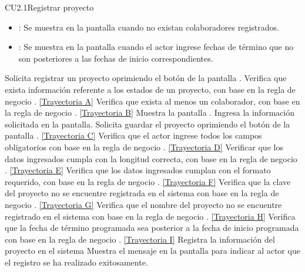 \begin{UseCase}{CU2.1}{Registrar proyecto}
{\begin{itemize}
		\item {}: Se muestra en la pantalla  cuando no existan colaboradores registrados.
		\item {}: Se muestra en la pantalla  cuando el actor ingrese fechas de término que no son posteriores a las fechas
		de inicio correspondientes.
		\end{itemize}
		}
	\end{UseCase}
	\begin{UCtrayectoria}
		\UCpaso[\UCactor] Solicita registrar un proyecto oprimiendo el botón  de la pantalla .
		\UCpaso[\UCsist] Verifica que exista información referente a los estados de un proyecto, con base en la regla de negocio . \hyperlink{CU2-1:TAA}{[Trayectoria A]}
		\UCpaso[\UCsist] Verifica que exista al menos un colaborador, con base en la regla de negocio . \hyperlink{CU2-1:TAB}{[Trayectoria B]}
		\UCpaso[\UCsist] Muestra la pantalla .
		\UCpaso[\UCactor] Ingresa la información solicitada en la pantalla. \label{CU2.1-P5}
		\UCpaso[\UCactor] Solicita guardar el proyecto oprimiendo el botón  de la pantalla . \hyperlink{CU2-1:TAC}{[Trayectoria C]}
		\UCpaso[\UCsist] Verifica que el actor ingrese todos los campos obligatorios con base en la regla de negocio . \hyperlink{CU2-1:TAD}{[Trayectoria D]}
		\UCpaso[\UCsist] Verificar que los datos ingresados cumpla con la longitud correcta, con base en la regla de negocio . \hyperlink{CU2-1:TAE}{[Trayectoria E]}
		\UCpaso[\UCsist] Verifica que los datos ingresados cumplan con el formato requerido, con base en la regla de negocio . \hyperlink{CU2-1:TAF}{[Trayectoria F]}
		\UCpaso[\UCsist] Verifica que la clave del proyecto no se encuentre registrada en el sistema con base en la regla de negocio . \hyperlink{CU2-1:TAG}{[Trayectoria G]}
		\UCpaso[\UCsist] Verifica que el nombre del proyecto no se encuentre registrado en el sistema con base en la regla de negocio . \hyperlink{CU2-1:TAH}{[Trayectoria H]}
		\UCpaso[\UCsist] Verifica que la fecha de término programada sea posterior a la fecha de inicio programada con base en la regla de negocio . \hyperlink{CU2-1:TAI}{[Trayectoria I]}
		\UCpaso[\UCsist] Registra la información del proyecto en el sistema
		\UCpaso[\UCsist] Muestra el mensaje  en la pantalla  para indicar al actor que el registro se ha realizado exitosamente.
	\end{UCtrayectoria}		
